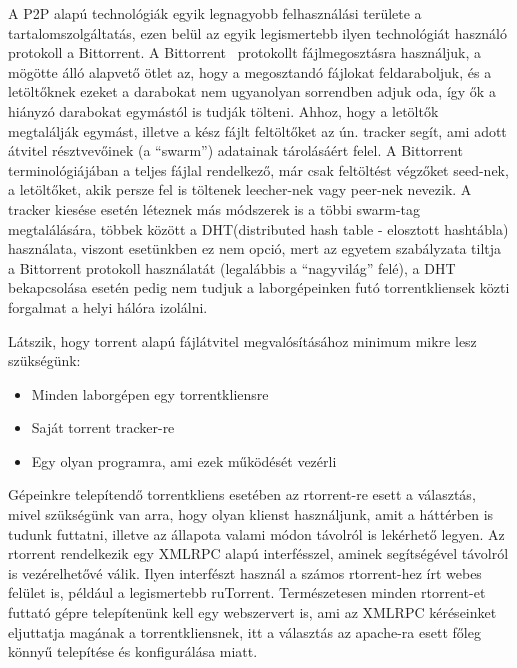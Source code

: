 A P2P alapú technológiák egyik legnagyobb felhasználási területe a tartalomszolgáltatás, ezen belül
az egyik legismertebb ilyen technológiát használó protokoll a Bittorrent. A Bittorrent~\cite{cohen2008bittorrent} protokollt
fájlmegosztásra használjuk, a mögötte álló alapvető ötlet az, hogy a megosztandó fájlokat
feldaraboljuk, és a letöltőknek ezeket a darabokat nem ugyanolyan sorrendben adjuk oda, így ők a
hiányzó darabokat egymástól is tudják tölteni. Ahhoz, hogy a letöltők megtalálják egymást, illetve a kész fájlt feltöltőket az ún. tracker segít, ami adott átvitel résztvevőinek (a ``swarm'') adatainak tárolásáért felel. A Bittorrent terminológiájában a teljes fájlal rendelkező, már csak feltöltést végzőket seed-nek, a letöltőket, akik persze fel is töltenek leecher-nek vagy peer-nek nevezik. A tracker kiesése esetén léteznek más módszerek is a többi swarm-tag megtalálására, többek között a DHT\cite{rescorla2006introduction}(distributed hash table - elosztott hashtábla) használata, viszont esetünkben ez nem opció, mert az egyetem szabályzata tiltja a Bittorrent protokoll használatát (legalábbis a ``nagyvilág'' felé), a DHT bekapcsolása esetén pedig nem tudjuk a laborgépeinken futó torrentkliensek közti forgalmat a helyi hálóra izolálni.

Látszik, hogy torrent alapú fájlátvitel megvalósításához minimum mikre lesz szükségünk:
\begin{itemize}
	\item Minden laborgépen egy torrentkliensre
	\item Saját torrent tracker-re
	\item Egy olyan programra, ami ezek működését vezérli
\end{itemize}

Gépeinkre telepítendő torrentkliens esetében az rtorrent-re\cite{sundell2012libtorrent} esett a választás, mivel szükségünk van arra, hogy olyan klienst használjunk, amit a háttérben is tudunk futtatni, illetve az állapota valami módon távolról is lekérhető legyen. Az rtorrent rendelkezik egy XMLRPC\cite{merrick2006xml} alapú interfésszel, aminek segítségével távolról is vezérelhetővé válik. Ilyen interfészt használ a számos rtorrent-hez írt webes felület is, például a legismertebb ruTorrent\cite{rutorrent}. Természetesen minden rtorrent-et futtató gépre telepítenünk kell egy webszervert is, ami az XMLRPC kéréseinket eljuttatja magának a torrentkliensnek, itt a választás az apache-ra\cite{fielding1997apache} esett főleg könnyű telepítése és konfigurálása miatt.

